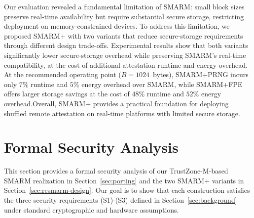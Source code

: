 \documentclass{ieeeaccess}
\newcommand{\rtsmarm}{SMARM+\xspace}
\newcommand{\rtsmarmone}{SMARM+PRNG\xspace}
\newcommand{\rtsmarmtwo}{SMARM+FPE\xspace}
\begin{document}
Our evaluation revealed a fundamental limitation of SMARM: small block sizes preserve real-time availability but require substantial secure storage, restricting deployment on memory-constrained devices. To address 
this limitation, we proposed \rtsmarm with two variants that reduce secure-storage requirements through different design trade-offs. Experimental results show that both variants significantly lower secure-storage overhead while preserving SMARM's real-time compatibility, at 
the cost of additional attestation runtime and energy overhead. At the recommended operating point ($B = 1024$~bytes), \rtsmarmone incurs only $7\%$ runtime and $5\%$ energy overhead over SMARM, while \rtsmarmtwo offers larger storage savings at the cost of $48\%$ runtime and $52\%$ energy overhead.Overall, \rtsmarm provides a practical foundation for 
deploying shuffled remote attestation on real-time platforms with limited secure storage.












\appendices

\section{\break Formal Security Analysis}
\label{sec:formal-security}
 
This section provides a formal security analysis of our TrustZone-M-based SMARM realization in Section~\ref{sec:porting} and the two SMARM+ variants in Section~\ref{sec:resmarm-design}.
Our goal is to show that each construction satisfies the three security requirements (S1)-(S3) defined in Section~\ref{sec:background} under standard cryptographic and hardware assumptions.
 
\end{document}
